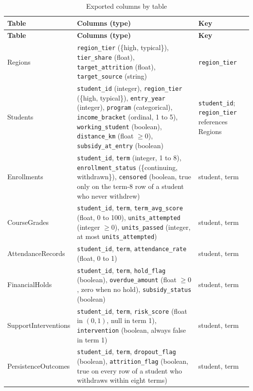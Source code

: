 \documentclass[11pt]{article}
\begin{document}
{\small
\begin{longtable}{@{}p{}p{}p{}@{}}
\caption{Exported columns by table}\label{tab:schema}\\
\toprule
\textbf{Table} & \textbf{Columns (type)} & \textbf{Key} \\
\midrule
\endfirsthead
\toprule
\textbf{Table} & \textbf{Columns (type)} & \textbf{Key} \\
\midrule
\endhead
\bottomrule
\endfoot
Regions & \texttt{region\_tier} (\{high, typical\}), \texttt{tier\_share} (float), \texttt{target\_attrition} (float), \texttt{target\_source} (string) & \texttt{region\_tier} \\
\addlinespace
Students & \texttt{student\_id} (integer), \texttt{region\_tier} (\{high, typical\}), \texttt{entry\_year} (integer), \texttt{program} (categorical), \texttt{income\_bracket} (ordinal, 1 to 5), \texttt{working\_student} (boolean), \texttt{distance\_km} (float $\ge 0$), \texttt{subsidy\_at\_entry} (boolean) & \texttt{student\_id}; \texttt{region\_tier} references Regions \\
\addlinespace
Enrollments & \texttt{student\_id}, \texttt{term} (integer, 1 to 8), \texttt{enrollment\_status} (\{continuing, withdrawn\}), \texttt{censored} (boolean, true only on the term-8 row of a student who never withdrew) & student, term \\
\addlinespace
CourseGrades & \texttt{student\_id}, \texttt{term}, \texttt{term\_avg\_score} (float, 0 to 100), \texttt{units\_attempted} (integer $\ge 0$), \texttt{units\_passed} (integer, at most \texttt{units\_attempted}) & student, term \\
\addlinespace
AttendanceRecords & \texttt{student\_id}, \texttt{term}, \texttt{attendance\_rate} (float, 0 to 1) & student, term \\
\addlinespace
FinancialHolds & \texttt{student\_id}, \texttt{term}, \texttt{hold\_flag} (boolean), \texttt{overdue\_amount} (float $\ge 0$, zero when no hold), \texttt{subsidy\_status} (boolean) & student, term \\
\addlinespace
SupportInterventions & \texttt{student\_id}, \texttt{term}, \texttt{risk\_score} (float in $(0,1)$, null in term 1), \texttt{intervention} (boolean, always false in term 1) & student, term \\
\addlinespace
PersistenceOutcomes & \texttt{student\_id}, \texttt{term}, \texttt{dropout\_flag} (boolean), \texttt{attrition\_flag} (boolean, true on every row of a student who withdraws within eight terms) & student, term \\
\end{longtable}
}
\end{document}
